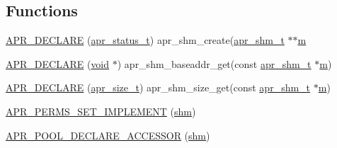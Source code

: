 \subsection*{Functions}
\begin{DoxyCompactItemize}
\item 
\hyperlink{group__apr__shm_ga9556068323f037a43a12d5a786531bfe}{A\+P\+R\+\_\+\+D\+E\+C\+L\+A\+RE} (\hyperlink{group__apr__errno_gaa5105fa83cc322f09382292db8b47593}{apr\+\_\+status\+\_\+t}) apr\+\_\+shm\+\_\+create(\hyperlink{structapr__shm__t}{apr\+\_\+shm\+\_\+t} $\ast$$\ast$\hyperlink{pcretest_8txt_a26e37b17bbd51407fc4163ca327065e4}{m}
\item 
\hyperlink{group__apr__shm_ga4a32d22bb2597ba484dbfe0668e60caa}{A\+P\+R\+\_\+\+D\+E\+C\+L\+A\+RE} (\hyperlink{group__MOD__ISAPI_gacd6cdbf73df3d9eed42fa493d9b621a6}{void} $\ast$) apr\+\_\+shm\+\_\+baseaddr\+\_\+get(const \hyperlink{structapr__shm__t}{apr\+\_\+shm\+\_\+t} $\ast$\hyperlink{pcretest_8txt_a26e37b17bbd51407fc4163ca327065e4}{m})
\item 
\hyperlink{group__apr__shm_ga916236d26c53ae751c5e56e5ae9f3b09}{A\+P\+R\+\_\+\+D\+E\+C\+L\+A\+RE} (\hyperlink{group__apr__platform_gaaa72b2253f6f3032cefea5712a27540e}{apr\+\_\+size\+\_\+t}) apr\+\_\+shm\+\_\+size\+\_\+get(const \hyperlink{structapr__shm__t}{apr\+\_\+shm\+\_\+t} $\ast$\hyperlink{pcretest_8txt_a26e37b17bbd51407fc4163ca327065e4}{m})
\item 
\hyperlink{group__apr__shm_gaf519a2435ffc3524a8b9ba0b67fe7aa5}{A\+P\+R\+\_\+\+P\+E\+R\+M\+S\+\_\+\+S\+E\+T\+\_\+\+I\+M\+P\+L\+E\+M\+E\+NT} (\hyperlink{group__apr__portabile_gadb5b80323e350ae97e0793c7ef27cde7}{shm})
\item 
\hyperlink{group__apr__shm_ga2f33ef81c957af596afa3417a4748d3e}{A\+P\+R\+\_\+\+P\+O\+O\+L\+\_\+\+D\+E\+C\+L\+A\+R\+E\+\_\+\+A\+C\+C\+E\+S\+S\+OR} (\hyperlink{group__apr__portabile_gadb5b80323e350ae97e0793c7ef27cde7}{shm})
\end{DoxyCompactItemize}
